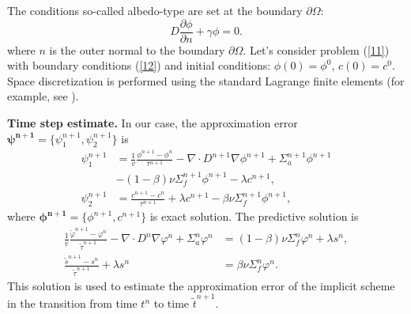\documentclass[runningheads]{llncs}
\begin{document}
The conditions so-called albedo-type are set at the boundary $\partial \Omega$:
\begin{equation}\label{12}
 D\frac{\partial \phi}{\partial n} + \gamma \phi = 0.
\end{equation}\label{13}
where $n$ is the outer normal to the boundary $\partial \Omega$.
Let's consider problem (\ref{11}) with boundary conditions (\ref{12}) and initial conditions:
$
 \phi(0) = \phi^0,  \,
 c(0) = c^0.
$
Space discretization is performed using the standard Lagrange finite elements (for example, see \cite{Matmod}).

\textbf{Time step estimate.}
In our case, the approximation error $\bm{\psi^{n+1}} = \{\psi^{n+1}_1, \psi^{n+1}_2\}$ is
\begin{equation}\label{14}
\begin{split}
\psi^{n+1}_1  & =  \frac{1}{v} \frac{\phi^{n+1}-\phi^n}{\tau^{n+1}} - \nabla \cdot D^{n+1} \nabla \phi^{n+1} + \Sigma_{a}^{n+1} \phi^{n+1} \\
 & - (1-\beta) \nu \Sigma^{n+1}_{f} \phi^{n+1} - \lambda  c^{n+1}, \\
\psi^{n+1}_2  & =  \frac{ c^{n+1}-c^n}{\tau^{n+1}} + \lambda c^{n+1} - \beta \nu\Sigma_{f}^{n+1} \phi^{n+1},
\end{split}
\end{equation} 
where $\bm{\phi^{n+1}} = \{ \phi^{n+1}, c^{n+1} \}$ is exact solution.
The predictive solution is 
\begin{equation}\label{15}
\begin{split}
\frac{1}{v} \frac{\widetilde\varphi^{n+1}-\varphi^n}{\widetilde\tau^{n+1}} - \nabla \cdot D^n \nabla \varphi^n + \Sigma^n_{a} \varphi^n & = (1-\beta) \nu \Sigma^n_{f} \varphi^n + \lambda s^n, \\
\frac{\widetilde s^{n+1}-s^n}{\widetilde\tau^{n+1}} + \lambda s^n &= \beta \nu\Sigma^n_{f} \varphi^n.
\end{split}
\end{equation} 
This solution is used to estimate the approximation error of the implicit scheme in the transition from time $t^n$ to time $\widetilde{t}^{n+1}$.
\end{document}
